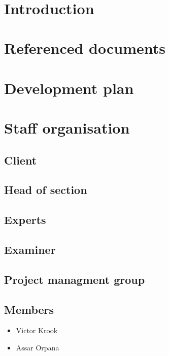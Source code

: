 \documentclass{article}
\date {#1}
\title {
    \documentNumber {01}    %
    \documentVersion {0.1}
    \documentTitle {Software development plan - SDP}
    \documentGroup {2}
    \documentResponsible {(PG) Projet-management Group}
    \documentAuthors {(PG) Projet-management Group}
    \documentDate {\today}
}
\begin{document}
\maketitle
\thispagestyle{empty}

\newpage

\tableofcontents

\newpage

\section{Introduction}

\section{Referenced documents}

\section{Development plan}

\section{Staff organisation}

    \subsection{Client}
    
    \subsection{Head of section}
    
    \subsection{Experts}
    
    \subsection{Examiner}
    
    \subsection{Project managment group}
        \subsection{Members}
            \begin{itemize}
                \item Victor Krook
                \item Assar Orpana
            \end{itemize}
        
\end{document}
